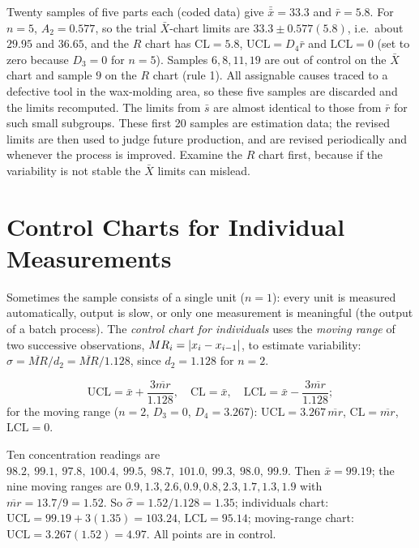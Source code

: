 \begin{example}
Twenty samples of five parts each (coded data) give $\bar{\bar{x}}=33.3$ and $\bar{r}=5.8$. For $n=5$, $A_2=0.577$, so the trial $\bar{X}$-chart limits are $33.3\pm0.577(5.8)$, i.e.\ about $29.95$ and $36.65$, and the $R$ chart has $\mathrm{CL}=5.8$, $\mathrm{UCL}=D_4\bar{r}$ and $\mathrm{LCL}=0$ (set to zero because $D_3=0$ for $n=5$). Samples $6, 8, 11, 19$ are out of control on the $\bar{X}$ chart and sample $9$ on the $R$ chart (rule 1). All assignable causes traced to a defective tool in the wax-molding area, so these five samples are discarded and the limits recomputed. The limits from $\bar{s}$ are almost identical to those from $\bar{r}$ for such small subgroups. These first 20 samples are estimation data; the revised limits are then used to judge future production, and are revised periodically and whenever the process is improved. Examine the $R$ chart first, because if the variability is not stable the $\bar{X}$ limits can mislead.
\end{example}

\section{Control Charts for Individual Measurements}

Sometimes the sample consists of a single unit ($n=1$): every unit is measured automatically, output is slow, or only one measurement is meaningful (the output of a batch process). The \emph{control chart for individuals} uses the \emph{moving range} of two successive observations, $MR_i=\lvert x_i-x_{i-1}\rvert$, to estimate variability: $\hat\sigma=\overline{MR}/d_2=\overline{MR}/1.128$, since $d_2=1.128$ for $n=2$.

\begin{theorem}\label{thm:individuals}
\[ \mathrm{UCL}=\bar{x}+\frac{3\overline{mr}}{1.128},\quad\mathrm{CL}=\bar{x},\quad\mathrm{LCL}=\bar{x}-\frac{3\overline{mr}}{1.128}; \]
for the moving range ($n=2$, $D_3=0$, $D_4=3.267$): $\mathrm{UCL}=3.267\,\overline{mr}$, $\mathrm{CL}=\overline{mr}$, $\mathrm{LCL}=0$.
\end{theorem}

\begin{example}
Ten concentration readings are $98.2,\ 99.1,\ 97.8,\ 100.4,\ 99.5,\ 98.7,\ 101.0,\ 99.3,\ 98.0,\ 99.9$. Then $\bar{x}=99.19$; the nine moving ranges are $0.9,1.3,2.6,0.9,0.8,2.3,1.7,1.3,1.9$ with $\overline{mr}=13.7/9=1.52$. So $\hat\sigma=1.52/1.128=1.35$; individuals chart: $\mathrm{UCL}=99.19+3(1.35)=103.24$, $\mathrm{LCL}=95.14$; moving-range chart: $\mathrm{UCL}=3.267(1.52)=4.97$. All points are in control.
\end{example}

